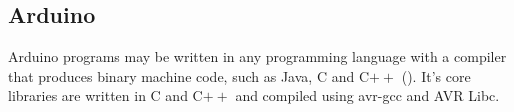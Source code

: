 \subsection{Arduino}
Arduino programs may be written in any programming language with a compiler that produces binary machine code, such as Java, C and C$++$ (\cite{arduino}). It's core libraries are written in C and C$++$ and compiled using avr-gcc and AVR Libc. 